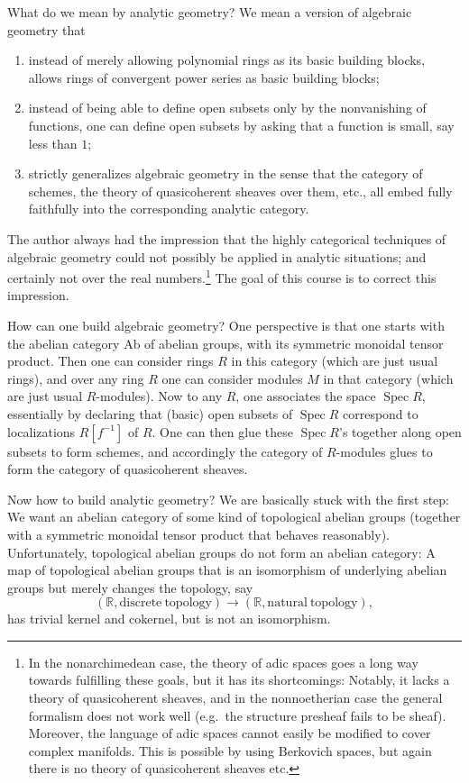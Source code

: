 \documentclass[11pt]{amsbook}
\DeclareMathOperator{\Spec}{Spec}
\numberwithin{equation}{section}
\numberwithin{theorem}{section}
\theoremstyle{definition}
\begin{document}
What do we mean by analytic geometry? We mean a version of algebraic geometry that
\begin{enumerate}
\item instead of merely allowing polynomial rings as its basic building blocks, allows rings of convergent power series as basic building blocks;
\item instead of being able to define open subsets only by the nonvanishing of functions, one can define open subsets by asking that a function is small, say less than $1$;
\item strictly generalizes algebraic geometry in the sense that the category of schemes, the theory of quasicoherent sheaves over them, etc., all embed fully faithfully into the corresponding analytic category.
\end{enumerate}

The author always had the impression that the highly categorical techniques of algebraic geometry could not possibly be applied in analytic situations; and certainly not over the real numbers.\footnote{In the nonarchimedean case, the theory of adic spaces goes a long way towards fulfilling these goals, but it has its shortcomings: Notably, it lacks a theory of quasicoherent sheaves, and in the nonnoetherian case the general formalism does not work well (e.g.~the structure presheaf fails to be sheaf). Moreover, the language of adic spaces cannot easily be modified to cover complex manifolds. This is possible by using Berkovich spaces, but again there is no theory of quasicoherent sheaves etc.} The goal of this course is to correct this impression.

How can one build algebraic geometry? One perspective is that one starts with the abelian category $\mathrm{Ab}$ of abelian groups, with its symmetric monoidal tensor product. Then one can consider rings $R$ in this category (which are just usual rings), and over any ring $R$ one can consider modules $M$ in that category (which are just usual $R$-modules). Now to any $R$, one associates the space $\Spec R$, essentially by declaring that (basic) open subsets of $\Spec R$ correspond to localizations $R[f^{-1}]$ of $R$. One can then glue these $\Spec R$'s together along open subsets to form schemes, and accordingly the category of $R$-modules glues to form the category of quasicoherent sheaves.

Now how to build analytic geometry? We are basically stuck with the first step: We want an abelian category of some kind of topological abelian groups (together with a symmetric monoidal tensor product that behaves reasonably). Unfortunately, topological abelian groups do not form an abelian category: A map of topological abelian groups that is an isomorphism of underlying abelian groups but merely changes the topology, say
\[
(\mathbb R,\mathrm{discrete\ topology})\to (\mathbb R,\mathrm{natural\ topology}),
\]
has trivial kernel and cokernel, but is not an isomorphism.
\end{document}
